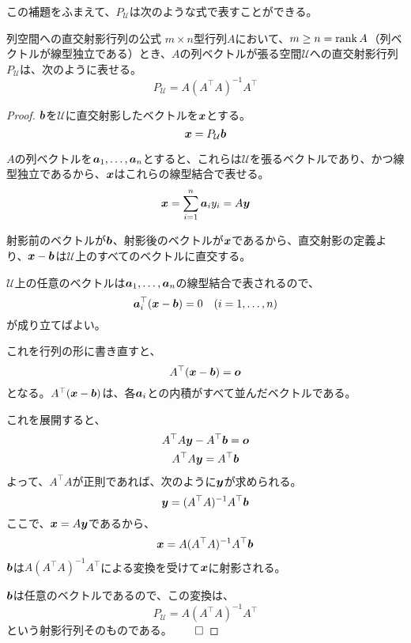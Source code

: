 \documentclass[../../../topic_linear-algebra]{subfiles}
\begin{document}
\br

この補題をふまえて、$P_{\mathcal{U}}$は次のような式で表すことができる。

\begin{theorem}{列空間への直交射影行列の公式}
  $m \times n$型行列$A$において、$m \geq n = \rank A$（列ベクトルが線型独立である）とき、$A$の列ベクトルが張る空間$\mathcal{U}$への直交射影行列$P_{\mathcal{U}}$は、次のように表せる。
  \begin{equation*}
    P_{\mathcal{U}} = A(A^\top A)^{-1}A^\top
  \end{equation*}
\end{theorem}

\begin{proof}
  $\vb*{b}$を$\mathcal{U}$に直交射影したベクトルを$\vb*{x}$とする。
  \begin{equation*}
    \vb*{x} = P_{\mathcal{U}}\vb*{b}
  \end{equation*}
  
  $A$の列ベクトルを$\vb*{a}_1, \ldots, \vb*{a}_n$とすると、これらは$\mathcal{U}$を張るベクトルであり、かつ線型独立であるから、$\vb*{x}$はこれらの線型結合で表せる。
  \begin{equation*}
    \vb*{x} = \sum_{i=1}^n \vb*{a}_i y_i = A\vb*{y}
  \end{equation*}
  
  射影前のベクトルが$\vb*{b}$、射影後のベクトルが$\vb*{x}$であるから、直交射影の定義より、$\vb*{x} - \vb*{b}$は$\mathcal{U}$上のすべてのベクトルに直交する。
  
  $\mathcal{U}$上の任意のベクトルは$\vb*{a}_1, \ldots, \vb*{a}_n$の線型結合で表されるので、
  \begin{equation*}
    \vb*{a}_i^\top (\vb*{x} - \vb*{b}) = 0 \quad (i = 1, \ldots, n)
  \end{equation*}
  が成り立てばよい。
  
  これを行列の形に書き直すと、
  \begin{equation*}
    A^\top (\vb*{x} - \vb*{b}) = \vb*{o}
  \end{equation*}
  となる。$A^\top (\vb*{x} - \vb*{b})$は、各$\vb*{a}_i$との内積がすべて並んだベクトルである。
  
  これを展開すると、
  \begin{gather*}
    A^\top A \vb*{y} - A^\top \vb*{b} = \vb*{o} \\
    A^\top A \vb*{y} = A^\top \vb*{b}
  \end{gather*}
  よって、$A^\top A$が正則であれば、次のように$\vb*{y}$が求められる。
  \begin{equation*}
    \vb*{y} = (A^\top A)^{-1}A^\top \vb*{b}
  \end{equation*}
  ここで、$\vb*{x} = A\vb*{y}$であるから、
  \begin{equation*}
    \vb*{x} = A(A^\top A)^{-1}A^\top \vb*{b}
  \end{equation*}
  $\vb*{b}$は$A(A^\top A)^{-1}A^\top$による変換を受けて$\vb*{x}$に射影される。
  
  $\vb*{b}$は任意のベクトルであるので、この変換は、
  \begin{equation*}
    P_{\mathcal{U}} = A(A^\top A)^{-1}A^\top
  \end{equation*}
  という射影行列そのものである。$\qed$
\end{proof}
\end{document}
